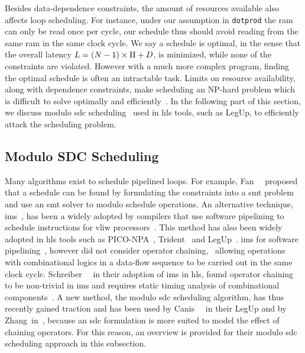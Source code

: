 Besides data-dependence constraints, the amount of resources available also
affects loop scheduling.  For instance, under our assumption in \verb|dotprod|
the \gls{ram} can only be read once per cycle, our schedule thus should avoid
reading from the same \gls{ram} in the same clock cycle.  We say a schedule is
optimal, in the sense that the overall latency $L = (N - 1) \times \mathrm{II} + D$,
is minimized, while none of the constraints are violated.  However with a much
more complex program, finding the optimal schedule is often an intractable
task.  Limits on resource availability, along with dependence constraints,
make scheduling an NP-hard problem which is difficult to solve optimally and
efficiently~\cite{hwang91}.  In the following part of this section, we discuss
modulo \gls{sdc} scheduling~\cite{zhang13, canis14} used in \gls{hls} tools,
such as LegUp, to efficiently attack the scheduling problem.


\subsection{Modulo SDC Scheduling}
\label{bg:sub:sdc}

Many algorithms exist to schedule pipelined loops.  For example,
Fan~\etal~\cite{fan08} proposed that a schedule can be found by formulating
the constraints into a \gls{smt} problem and use an \gls{smt} solver to modulo
schedule operations.  An alternative technique, \gls{ims}~\cite{rau94}, has
been a widely adopted by compilers that use software pipelining to schedule
instructions for \gls{vliw} processors~\cite{mcnairy03}.  This method has also
been widely adopted in \gls{hls} tools such as PICO-NPA~\cite{schreiber02},
Trident~\cite{tripp05} and LegUp~\cite{canis13, canis14}.  \Gls{ims} for
software pipelining~\cite{rau94}, however did not consider operator chaining,
\ie~allowing operations with combinational logics in a data-flow sequence to
be carried out in the same clock cycle.  Schreiber~\etal~\cite{schreiber02}
in their adoption of \gls{ims} in \gls{hls}, found operator chaining
to be non-trivial in \gls{ims} and requires static timing analysis of
combinational components~\cite{canis14}.  A new method, the modulo \gls{sdc}
scheduling algorithm, has thus recently gained traction and has been used by
Canis~\etal~\cite{canis14} in their LegUp and by Zhang~\etal in~\cite{zhang13},
because an \gls{sdc} formulation is more suited to model the effect of chaining
operators.  For this reason, an overview is provided for their modulo \gls{sdc}
scheduling approach in this subsection.

